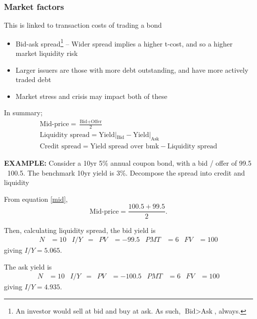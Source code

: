 \documentclass[../notes_compiled.tex]{subfiles}
\begin{document}
\subsubsection*{Market factors}
\begin{itemize}
\item This is linked to transaction costs of trading a bond
\begin{itemize}
\item Bid-ask spread\footnote{An investor would sell at bid and buy at ask. As such, $\text{Bid} > \text{Ask}$, always.} -- Wider spread implies a higher t-cost, and so a higher market liquidity risk
\item Larger issuers are those with more debt outstanding, and have more actively traded debt
\item Market stress and crisis may impact both of these
\end{itemize}


\item In summary;
\begin{gather*}
\text{Mid-price} = \frac{\text{Bid} + \text{Offer}}{2} \label{mid}\\
\text{Liquidity spread} = \text{Yield}|_{\text{Bid}} - \text{Yield}|_{\text{Ask}} \label{liq-spread} \\
\text{Credit spread} = \text{Yield spread over bmk} - \text{Liquidity spread} \label{credit-spread}
\end{gather*}


{\color{RedViolet}
\item[] \textbf{EXAMPLE:} Consider a 10yr 5\% annual coupon bond, with a bid / offer of 99.5 \ 100.5. The benchmark 10yr yield is 3\%. Decompose the spread into credit and liquidity
}

{\color{RoyalBlue}
\item[] From equation \ref{mid},
\begin{equation*}
\text{Mid-price} = \frac{100.5 + 99.5}{2}.
\end{equation*}

Then, calculating liquidity spread, the bid yield is
\begin{align*}
N&=10  & I / Y &= & PV &=-99.5 & PMT &=6 & FV &=100
\end{align*}
giving $I / Y = 5.065$.

\item[] The ask yield is
\begin{align*}
N&=10  & I / Y &= & PV &=-100.5 & PMT &=6 & FV &=100
\end{align*}
giving $I / Y = 4.935$.

}
\end{itemize}
\end{document}
